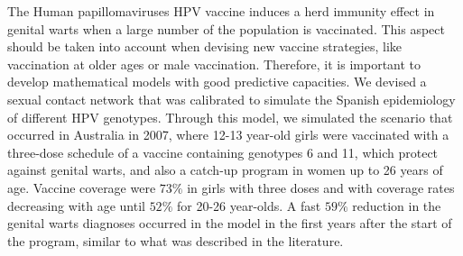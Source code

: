 The Human papillomaviruses HPV vaccine induces a herd immunity effect in genital warts when a large number of the population is vaccinated. This aspect should be taken into account when devising new vaccine strategies, like vaccination at older ages or male vaccination. Therefore, it is important to develop mathematical models with good predictive capacities. We devised a sexual contact network that was calibrated to simulate the Spanish epidemiology of different HPV genotypes. Through this model, we simulated the scenario that occurred in Australia in 2007, where 12-13 year-old girls were vaccinated with a three-dose schedule of a vaccine containing genotypes 6 and 11, which protect against genital warts, and also a catch-up program in women up to 26 years of age. Vaccine coverage were $73\%$ in girls with three doses and with coverage rates decreasing with age until $52\%$ for 20-26 year-olds. A fast $59\%$ reduction in the genital warts diagnoses occurred in the model in the first years after the start of the program, similar to what was described in the literature.

